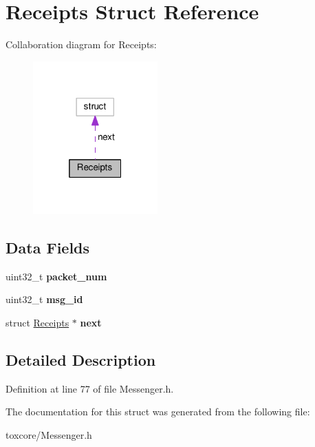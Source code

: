 \hypertarget{struct_receipts}{\section{Receipts Struct Reference}
\label{struct_receipts}
}


Collaboration diagram for Receipts\+:\nopagebreak
\begin{figure}[H]
\begin{center}
\leavevmode
\includegraphics[width=136pt]{struct_receipts__coll__graph}
\end{center}
\end{figure}
\subsection*{Data Fields}
\begin{DoxyCompactItemize}
\item 
\hypertarget{struct_receipts_a3110fa374a202ca37de05e1bb9c95f17}{uint32\+\_\+t {\bfseries packet\+\_\+num}}\label{struct_receipts_a3110fa374a202ca37de05e1bb9c95f17}

\item 
\hypertarget{struct_receipts_a8d62bc717240dc62a7c3595d7b2a75ff}{uint32\+\_\+t {\bfseries msg\+\_\+id}}\label{struct_receipts_a8d62bc717240dc62a7c3595d7b2a75ff}

\item 
\hypertarget{struct_receipts_a4cf1c9c7aa66ba420c540e3070555c89}{struct \hyperlink{struct_receipts}{Receipts} $\ast$ {\bfseries next}}\label{struct_receipts_a4cf1c9c7aa66ba420c540e3070555c89}

\end{DoxyCompactItemize}


\subsection{Detailed Description}


Definition at line 77 of file Messenger.\+h.



The documentation for this struct was generated from the following file\+:\begin{DoxyCompactItemize}
\item 
toxcore/Messenger.\+h\end{DoxyCompactItemize}
